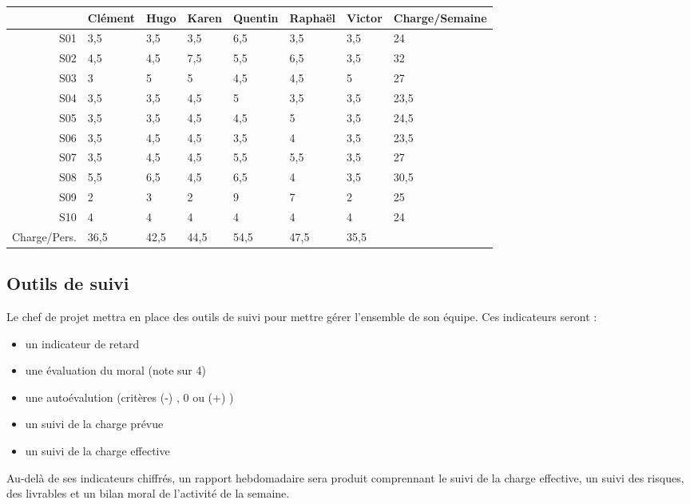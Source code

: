 \begin{longtable}{|r|l|l|l|l|l|l|l|}
\hline
&Clément&Hugo&Karen&Quentin&Raphaël&Victor&Charge/Semaine\\
\endhead \hline
S01&3,5&3,5&3,5&6,5&3,5&3,5&24\\
\hline
S02&4,5&4,5&7,5&5,5&6,5&3,5&32\\
\hline
S03&3&5&5&4,5&4,5&5&27\\
\hline
S04&3,5&3,5&4,5&5&3,5&3,5&23,5\\
\hline
S05&3,5&3,5&4,5&4,5&5&3,5&24,5\\
\hline
S06&3,5&4,5&4,5&3,5&4&3,5&23,5\\
\hline
S07&3,5&4,5&4,5&5,5&5,5&3,5&27\\
\hline
S08&5,5&6,5&4,5&6,5&4&3,5&30,5\\
\hline
S09&2&3&2&9&7&2&25\\
\hline
S10&4&4&4&4&4&4&24\\
\hline
Charge/Pers.&36,5&42,5&44,5&54,5&47,5&35,5&\\
\hline
\end{longtable}


\subsection{Outils de suivi}

Le chef de projet mettra en place des outils de suivi pour mettre gérer l'ensemble de son équipe. 
Ces indicateurs seront : 
\begin{itemize}
\item un indicateur de retard
\item une évaluation du moral (note sur 4)
\item une autoévalution (critères (-) , 0 ou (+) )
\item un suivi de la charge prévue
\item un suivi de la charge effective
\end{itemize}

Au-delà de ses indicateurs chiffrés, un rapport hebdomadaire sera produit comprennant le suivi de la charge effective, un suivi des risques, des livrables et un bilan moral de l'activité de la semaine.
